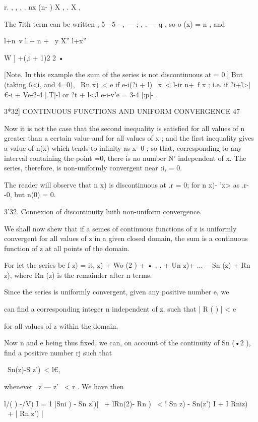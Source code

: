 r. , ,  ,   . nx (n-  )  X  , . X , 

The 7ith term can be written , 5—5 - , — ; , .  — q , so o (x) = n , and 

l+n\ v  l +  n + \ y X'' l+x'' 

  W ] +(,i + 1)2 2 • 

[Note. In this example the sum of the series is not discontinuous at   = 0.] 
But (taking 6<i, and  4=0), \ Rn x)\ < e if e-i(?i + l) \ x\ < l-ir n+\ f x  ; i.e. if 
?i+l>| €-i + Ve-2-4 |.T|-l or ?t + l<J e-i-v'e = 3-4 |:p|- . 



3*32] CONTINUOUS FUNCTIONS AND UNIFORM CONVERGENCE 47 

Now it is not the case that the second inequality is satisfied for all values of n greater 
than a certain value and for all values of x ; and the first inequality gives a value of 
n(x) which tends to infinity as x- 0 ; so that, corresponding to any interval containing the 
point  =0, there is no number N' independent of x. The series, therefore, is non-uniformly 
convergent near :i, = 0. 

The reader will observe that n x) is discontinuous at .r = 0; for n x)- 'x> as .r-  -0, 
but n(0) = 0. 

3'32. Connexion of discontinuity luith non-uniform convergence. 

We shall now shew that if a semes of continuous functions of z is uniformly 
convergent for all values of z in a given closed domain, the sum is a continuous 
function of z at all points of the domain. 

For let the series be f z) = it,  z) + Wo (2 ) + • . . + Un  z)+ ...— Sn (z) + Rn  z), 
where Rn (z) is the remainder after n terms. 

Since the series is uniformly convergent, given any positive number e, we 

can find a corresponding integer n independent of z, such that | R  ( ) | <   e 

for all values of z within the domain. 

Now n and e being thus fixed, we can, on account of the continuity of 
Sn (•2 ), find a positive number rj such that 

\ Sn(z)-S  z')\ < l€, 

whenever \ z — z' \ < r . 
We have then 

l/( ) -/V) I = 1 [Sni ) - Sn z')] \ + lRn(2)- Rn  ) \ 
< ! Sn z) - Sn(z') I + I Rniz) \ + | Rn z') | 

